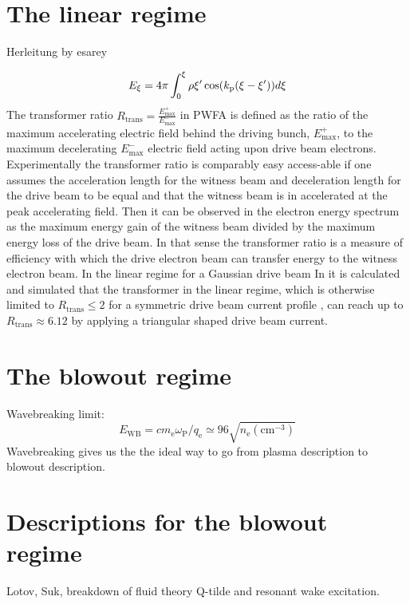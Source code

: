 \section{The linear regime}
Herleitung by esarey \cite{RevModPhys.81.1229}


\begin{equation}
E_\xi=4\pi \int_0^\xi \rho{\xi'}\cos(k_\mathrm{p}(\xi-\xi'))d\xi
\end{equation}
The transformer ratio $R_\mathrm{trans}=\frac{E_\mathrm{max}^+}{E_\mathrm{max}^-} $ in PWFA is defined as
the ratio of the maximum accelerating electric field
behind the driving bunch, $E_\mathrm{max}^+$, to the maximum decelerating $E_\mathrm{max}^-$
electric field acting upon drive beam electrons. Experimentally the transformer ratio is comparably easy access-able if one assumes the acceleration length for the witness beam and deceleration length for the drive beam to be equal and that the  witness beam is in accelerated at the peak accelerating field.
Then it can be observed in the electron energy spectrum as the maximum energy gain of the witness beam divided by the maximum energy loss of the drive beam. In that sense the transformer ratio is a measure of efficiency with which the drive electron beam can transfer energy to the witness electron beam. 
In the linear regime for a Gaussian drive beam 
In \cite{PhysRevLett.56.1252} it is calculated and simulated that the transformer in the linear regime, which is otherwise limited to $R_\mathrm{trans}\leq 2$ for a symmetric drive beam current profile \cite{bane1984wake}, can reach up to $R_\mathrm{trans}\approx 6.12$ by applying a triangular shaped drive beam current.
\section{The blowout regime}
\label{sec:Blowout_regime}


Wavebreaking limit: \begin{equation}
E_\mathrm{WB}=cm_\mathrm{e}\omega_\mathrm{P}/q_\mathrm{e}\simeq 96 \sqrt{n_\mathrm{e}(\mathrm{cm}^{-3})}
\end{equation}
Wavebreaking gives us the the ideal way to go from plasma description to blowout description.

\section{Descriptions for the blowout regime}
Lotov, Suk, breakdown of fluid theory
Q-tilde and resonant wake excitation.


